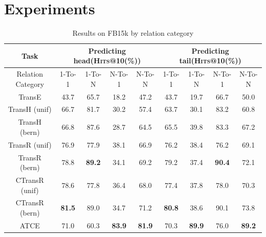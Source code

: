\section{Experiments}\label{sec:set}

\begin{table} %
  \centering
  \caption{Results on FB15k by relation category}
  \label{FB15k_results_by_relation_category}
  \begin{tabular}{c|cccc|cccc}
    \hline
    Task               & \multicolumn{4}{c|}{Predicting head(\textsc{Hits}@10(\%))} & \multicolumn{4}{c}{Predicting tail(\textsc{Hits}@10(\%))} \\
    \hline
    Relation Category  & 1-To-1        & 1-To-N        & N-To-1        & N-To-N        & 1-To-1        & 1-To-N        & N-To-1        & N-To-N \\
    \hline
    TransE             & 43.7          & 65.7          & 18.2          & 47.2          & 43.7          & 19.7          & 66.7          & 50.0   \\
    TransH (unif)      & 66.7          & 81.7          & 30.2          & 57.4          & 63.7          & 30.1          & 83.2          & 60.8   \\
    TransH (bern)      & 66.8          & 87.6          & 28.7          & 64.5          & 65.5          & 39.8          & 83.3          & 67.2   \\
    TransR (unif)      & 76.9          & 77.9          & 38.1          & 66.9          & 76.2          & 38.4          & 76.2          & 69.1   \\
    TransR (bern)      & 78.8          & \textbf{89.2} & 34.1          & 69.2          & 79.2          & 37.4          & \textbf{90.4} & 72.1   \\
    CTransR (unif)     & 78.6          & 77.8          & 36.4          & 68.0          & 77.4          & 37.8          & 78.0          & 70.3   \\
    CTransR (bern)     & \textbf{81.5} & 89.0          & 34.7          & 71.2          & \textbf{80.8} & 38.6          & 90.1          & 73.8   \\
    \hline
    ATCE                & 71.0          & 60.3          & \textbf{83.9} & \textbf{81.9} & 70.3          & \textbf{89.9} & 76.0          & \textbf{89.2}   \\
    \hline
\end{tabular}
\end{table}

